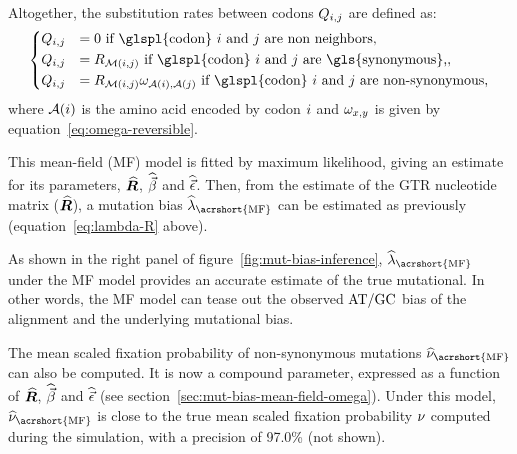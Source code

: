 Altogether, the \gls{substitution} rates between \glspl{codon} $Q_{{i}, {j}}$ are defined as:
\begin{equation}
    \begin{dcases}
        \submatrix_{\itoj} & = 0 \text{ if \glspl{codon} $\ci$ and $\cj$ are non neighbors}, \\
        \submatrix_{\itoj} & = \mutmatrix_{\nucitoj} \text{ if \glspl{codon} $\ci$ and $\cj$ are \gls{synonymous},}, \\
        \submatrix_{\itoj} & = \mutmatrix_{\nucitoj} \omega_{\aai, \aaj} \text{ if \glspl{codon} $\ci$ and $\cj$ are non-synonymous},
    \end{dcases}
    \label{eq:codon-mean-field}
\end{equation}
where $\mathcal{A}({i})$ is the amino acid encoded by \gls{codon} ${i}$ and $\omega_{x, y}$ is given by equation~\ref{eq:omega-reversible}.

This mean-field (\acrshort{MF}) model is fitted by maximum \gls{likelihood}, giving an estimate for its parameters, $\widehat{\bm{R}}$, $\widehat{\vec{\beta}}$ and $\widehat{\vec{\epsilon}}$.
Then, from the estimate of the \acrshort{GTR} nucleotide matrix ($\widehat{\bm{R}}$), a mutation bias $\widehat{\lambda}_{\text{\acrshort{MF}}}$ can be estimated as previously (equation~\ref{eq:lambda-R} above).

As shown in the right panel of figure~\ref{fig:mut-bias-inference}, $\widehat{\lambda}_{\text{\acrshort{MF}}}$ under the \acrshort{MF} model provides an accurate estimate of the true mutational.
In other words, the \acrshort{MF} model can tease out the observed $\text{AT/GC}$ bias of the alignment and the underlying mutational bias.

The mean scaled fixation probability of \gls{non-synonymous} mutations $\widehat{\avgpfix}_{\text{\acrshort{MF}}}$ can also be computed.
It is now a compound parameter, expressed as a function of $\widehat{\bm{R}}$, $\widehat{\vec{\beta}}$ and $\widehat{\vec{\epsilon}}$ (see section~\ref{sec:mut-bias-mean-field-omega}).
Under this model, $\widehat{\avgpfix}_{\text{\acrshort{MF}}}$ is close to the true mean scaled fixation probability $\nu$ computed during the simulation, with a precision of 97.0\% (not shown).

